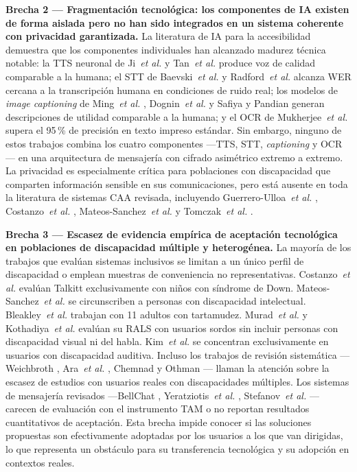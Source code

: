 \documentclass[journal]{IEEEtran}
\begin{document}
			\textbf{Brecha 2 --- Fragmentaci\'on tecnol\'ogica: los componentes de IA existen de forma aislada pero no han sido integrados en un sistema coherente con privacidad garantizada.} La literatura de IA para la accesibilidad demuestra que los componentes individuales han alcanzado madurez t\'ecnica notable: la TTS neuronal de Ji~\textit{et al.} \cite{ji2024} y Tan~\textit{et al.} \cite{tan2021} produce voz de calidad comparable a la humana; el STT de Baevski~\textit{et al.} \cite{baevski2020} y Radford~\textit{et al.} \cite{radford2023} alcanza WER cercana a la transcripci\'on humana en condiciones de ruido real; los modelos de \textit{image captioning} de Ming~\textit{et al.} \cite{ming2022}, Dognin~\textit{et al.} \cite{dognin2021} y Safiya y Pandian \cite{safiya2024} generan descripciones de utilidad comparable a la humana; y el OCR de Mukherjee~\textit{et al.} \cite{mukherjee2023} supera el 95\,\% de precisi\'on en texto impreso est\'andar. Sin embargo, ninguno de estos trabajos combina los cuatro componentes ---TTS, STT, \textit{captioning} y OCR--- en una arquitectura de mensajer\'ia con cifrado asim\'etrico extremo a extremo. La privacidad es especialmente cr\'itica para poblaciones con discapacidad que comparten informaci\'on sensible en sus comunicaciones, pero est\'a ausente en toda la literatura de sistemas CAA revisada, incluyendo Guerrero-Ulloa~\textit{et al.} \cite{guerrero2021bellchat}, Costanzo~\textit{et al.} \cite{costanzo2023}, Mateos-Sanchez~\textit{et al.} \cite{mateos2022} y Tomczak~\textit{et al.} \cite{tomczak2021}.
			
			\textbf{Brecha 3 --- Escasez de evidencia emp\'irica de aceptaci\'on tecnol\'ogica en poblaciones de discapacidad m\'ultiple y heterog\'enea.} La mayor\'ia de los trabajos que eval\'uan sistemas inclusivos se limitan a un \'unico perfil de discapacidad o emplean muestras de conveniencia no representativas. Costanzo~\textit{et al.} \cite{costanzo2023} eval\'uan Talkitt exclusivamente con ni\~nos con s\'indrome de Down. Mateos-Sanchez~\textit{et al.} \cite{mateos2022} se circunscriben a personas con discapacidad intelectual. Bleakley~\textit{et al.} \cite{bleakley2022} trabajan con 11 adultos con tartamudez. Murad~\textit{et al.} \cite{saleem2023} y Kothadiya~\textit{et al.} \cite{kothadiya2022} eval\'uan su RALS con usuarios sordos sin incluir personas con discapacidad visual ni del habla. Kim~\textit{et al.} \cite{kim2024} se concentran exclusivamente en usuarios con discapacidad auditiva. Incluso los trabajos de revisi\'on sistem\'atica ---Weichbroth \cite{weichbroth2020}, Ara~\textit{et al.} \cite{ara2024}, Chemnad y Othman \cite{chemnad2024}--- llaman la atenci\'on sobre la escasez de estudios con usuarios reales con discapacidades m\'ultiples. Los sistemas de mensajer\'ia revisados ---BellChat \cite{guerrero2021bellchat}, Yeratziotis~\textit{et al.} \cite{yeratziotis2023}, Stefanov~\textit{et al.} \cite{stefanov2024}--- carecen de evaluaci\'on con el instrumento TAM o no reportan resultados cuantitativos de aceptaci\'on. Esta brecha impide conocer si las soluciones propuestas son efectivamente adoptadas por los usuarios a los que van dirigidas, lo que representa un obst\'aculo para su transferencia tecnol\'ogica y su adopci\'on en contextos reales.
			
\end{document}
